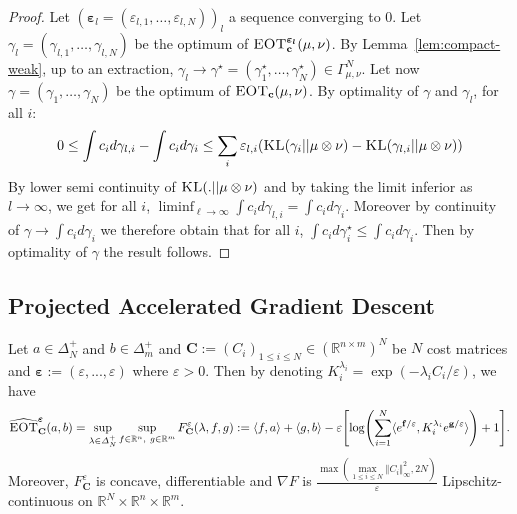 \begin{proof}
Let $(\bm{\varepsilon}_l=(\varepsilon_{l,1},\dots,\varepsilon_{l,N}))_l$ a sequence converging to $0$. Let $\gamma_l = (\gamma_{l,1},\dots,\gamma_{l,N})$ be the optimum of $\textsc{EOT}^{\bm{\varepsilon_l}}_\mathbf{c}(\mu,\nu)$. By Lemma~\ref{lem:compact-weak}, up to an extraction, $\gamma_l\rightarrow \gamma^\star=(\gamma^\star_{1},\dots,\gamma^\star_{N})\in\Gamma^N_{\mu,\nu}$. Let now $\gamma=(\gamma_{1},\dots,\gamma_{N})$ be the optimum of $\textsc{EOT}_\mathbf{c}(\mu,\nu)$. By optimality of $\gamma$ and $\gamma_l$, for all $i$: \begin{align*}
    0\leq  \int c_id\gamma_{l,i}-\int c_id\gamma_{i}\leq\sum_i\varepsilon_{l,i}\left(\KL(\gamma_{i}||\mu\otimes\nu)-\KL(\gamma_{l,i}||\mu\otimes\nu)\right)
\end{align*}
By lower semi continuity of $\textsc{KL}(.||\mu\otimes\nu)$ and by taking the limit inferior as $l\to\infty$, we get for all $i$, $\liminf_{\ell\rightarrow\infty} \int c_id\gamma_{l,i}=\int c_id\gamma_{i}$. Moreover by continuity of $\gamma\rightarrow \int c_i d\gamma_i$  we therefore obtain that for all $i$, $\int c_id\gamma^\star_{i}\leq \int c_id\gamma_{i}$. Then by optimality of $\gamma$ the result follows.
\end{proof}


\subsection{Projected Accelerated Gradient Descent}
\label{res:pgd}


\begin{prop}
\label{prop:algo-dual}
Let $a\in\Delta_N^{+}$ and $b\in\Delta^+_m$ and $\mathbf{C}:=(C_i)_{1\leq i\leq N}\in\left(\mathbb{R}^{n\times m}\right)^N$ be $N$ cost matrices and $\bm{\varepsilon}:=(\varepsilon,...,\varepsilon)$ where $\varepsilon>0$. Then by denoting $K_i^{\lambda_i} =\exp\left(-\lambda_i C_{i}/\varepsilon\right)$, we have
\begin{align*}
\widehat{\MOT}_{\mathbf{C}}^{\bm{\varepsilon}}(a,b)=\sup_{\lambda\in\Delta^+_N}\sup\limits_{f\in \mathbb{R}^n,~g\in \mathbb{R}^m} F_{\mathbf{C}}^{\varepsilon}(\lambda,f,g):= \langle f, a\rangle+\langle g,b\rangle -\varepsilon\left[\log\left(\sum_{i=1}^N\langle e^{\mathbf{f}/\varepsilon},K_i^{\lambda_i} e^{\mathbf{g}/\varepsilon}\rangle \right) + 1\right].
\end{align*}
Moreover, $F_{\mathbf{C}}^{\varepsilon}$ is concave, differentiable and $\nabla F$ is $\frac{\max\left(\max\limits_{1\leq i\leq N}\Vert C_i\Vert_{\infty}^2,2N\right)}{\varepsilon}$ Lipschitz-continuous on $\mathbb{R}^N\times \mathbb{R}^n \times\mathbb{R}^m$.
\end{prop}


